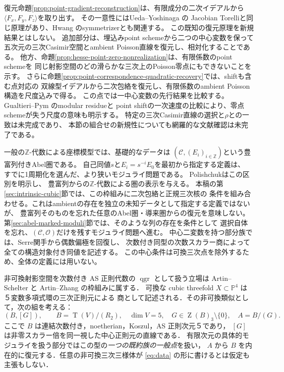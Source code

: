 \documentclass[11pt,a4paper]{ltjsarticle}
\numberwithin{equation}{section}
\newcommand{\PP}{\mathbb P}
\newcommand{\OO}{\mathcal O}
\newcommand{\qgr}{\operatorname{qgr}}
\newcommand{\Z}{\operatorname{Z}}
\newcommand{\Tens}{\operatorname{T}}
\begin{document}
復元命題\ref{prop:point-gradient-reconstruction}は、有限成分の二次イデアルから
$\langle F_x,F_y,F_z\rangle$を取り出す。
その一意性にはUeda--Yoshinaga \cite[\S3, Lemma~3]{UedaYoshinagaJacobian}の
Jacobian Torelliと同じ原理があり、Hwang
\cite[Definition~2.1 and Theorems~1.5--1.6]{HwangSymmetrizer}のsymmetrizerとも関連する。
この既知の復元原理を新規結果とはしない。
追加部分は、埋込みpoint schemeから二つの中心変数を保って
五次元の三次Casimir空間とambient Poisson直線を復元し、相対化することである。
他方、命題\ref{prop:hesse-point-zero-nonrealization}は、有限係数のpoint schemeを
同じ射影空間のどの滑らかな三次上のPoisson零点にもできないことを示す。
さらに命題\ref{prop:point-correspondence-quadratic-recovery}では、shiftも含む点対応の
双線型イデアルから二次包絡を復元し、有限係数のambient Poisson構造を尺度込みで得る。
この点では一中心変数の先行結果\cite[Proposition~4.2.5]{LeBruynSmithVdBCentral}を比較する。
Gualtieri--Pym \cite[Theorem~7.2]{GualtieriPym}のmodular residueと
point shiftの一次速度の比較により、零点schemeが失う尺度の意味も明示する。
特定の三次Casimir直線の選択と$\rho$との一致は未完成であり、
本節の組合せの新規性についても網羅的な文献確認は未完了である。

一般の$\mathbb Z$-代数による座標模型では、基礎的なデータは
$(\mathcal C,(E_i)_{i\in\mathbb Z})$という豊富列付きAbel圏である。
自己同値$s$と$E_i=s^{-i}E_0$を最初から指定する定義は、
すでに1周期化を選んだ、より狭いモジュライ問題である。
Polishchuk\cite[Theorem 2.4 and Remarks 2]{PolishchukProj}はこの区別を明示し、
豊富列からの$\mathbb Z$-代数による圏の表示を与える。
本稿の第\ref{sec:intrinsic-cubic}節では、この枠組みに二次包絡と正規三次核の
条件を組み合わせる。これはambientの存在を独立の未知データとして指定する定義ではないが、
豊富列そのものを忘れた任意のAbel圏・導来圏からの復元を意味しない。
第\ref{sec:abel-marked-moduli}節では、そのような列の存在を条件として
選択自体を忘れ、$(\mathcal C,\OO)$だけを残すモジュライ問題へ進む。
中心二変数を持つ部分族では、Serre関手から偶数偏極を回復し、
次数付き同型の次数スカラー商によって全ての構造対象付き同値を記述する。
この中心条件は可換三次点を除外するため、全体の定義には用いない。

非可換射影空間を次数付き AS 正則代数の $\qgr$ として扱う立場は
Artin--Schelter \cite{AS} と Artin--Zhang \cite{AZ} の枠組みに属する．
可換な cubic threefold $X\subset\PP^4$ は５変数多項式環の三次正則元による
商として記述される．その非可換類似として，次の組を考える：
\begin{equation}\label{eq:data}
 (B,[G]),\qquad B=\Tens(V)/(R_2),\quad\dim V=5,\quad
 G\in\Z(B)_3\setminus\{0\},\quad A=B/(G).
\end{equation}
ここで $B$ は連結次数付き，noetherian，Koszul，AS 正則次元５であり，
$[G]$ は非零スカラー倍を同一視した中心正則元の直線である．
有限次元の具体的モジュライを扱う部分ではこの型の\emph{一つの既約族の一般点}を扱い，
$A$ から $B$ を内在的に復元する．任意の非可換三次三様体が
\eqref{eq:data} の形に書けるとは仮定も主張もしない．
\end{document}
